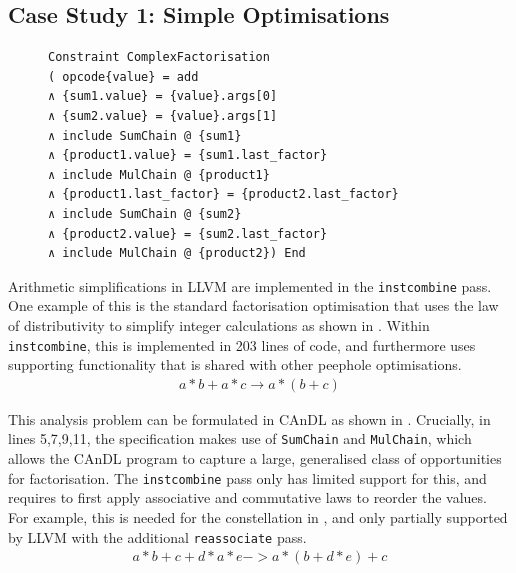 \subsection{Case Study 1: Simple Optimisations}

\begin{figure}[t]
\begin{lstlisting}[language=CAnDL,label={fig:facopport},caption=
   {Factorisation opportunities in CAnDL: This captures some opportunities that
    LLVM {\tt instcombine} misses. {\tt SumChain} and {\tt MulChain} are
    themselves specified in CAnDL (16 LoC).}]
Constraint ComplexFactorisation
( opcode{value} = add
∧ {sum1.value} = {value}.args[0]
∧ {sum2.value} = {value}.args[1]
∧ include SumChain @ {sum1}
∧ {product1.value} = {sum1.last_factor}
∧ include MulChain @ {product1}
∧ {product1.last_factor} = {product2.last_factor}
∧ include SumChain @ {sum2}
∧ {product2.value} = {sum2.last_factor}
∧ include MulChain @ {product2}) End
\end{lstlisting}
\end{figure}

    Arithmetic simplifications in LLVM are implemented in the
    \texttt{instcombine} pass.
    One example of this is the standard factorisation optimisation that uses the
    law of distributivity to simplify integer calculations as shown in
    .
    Within {\tt instcombine}, this is implemented in 203 lines of code, and
    furthermore uses supporting functionality that is shared with other peephole
    optimisations.
    \begin{align}
        a*b+a*c\rightarrow a*(b+c)
        \label{fig:factorization1}
    \end{align}

    This analysis problem can be formulated in CAnDL as shown in
    .
    Crucially, in lines 5,7,9,11, the specification makes use of
    \texttt{SumChain} and \texttt{MulChain}, which allows the CAnDL program
    to capture a large, generalised class of opportunities for factorisation.
    The \texttt{instcombine} pass only has limited support for this, and
    requires to first apply associative and commutative laws to reorder the
    values.
    For example, this is needed for the constellation in
    , and only partially supported by LLVM with the
    additional \texttt{reassociate} pass.
    \begin{align}
        a*b+c+d*a*e->a*(b+d*e)+c
        \label{fig:factorization2}
    \end{align}

